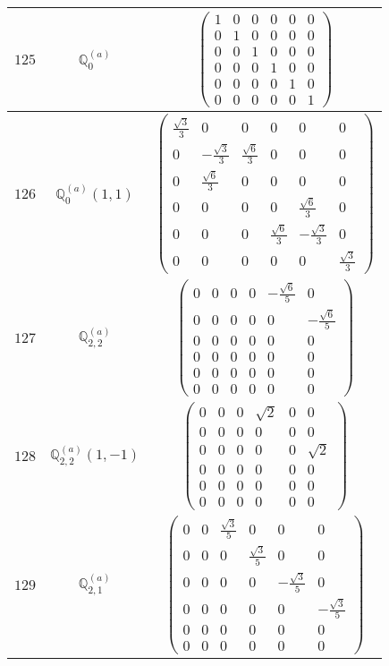 \documentclass[fleqn,8pt,landscape]{jsarticle}
\begin{document}
\begin{center}
\begin{longtable}{ccc}
$ 125 $ & $ \mathbb{Q}_{0}^{(a)} $ & $ \begin{pmatrix} 1 & 0 & 0 & 0 & 0 & 0 \\ 0 & 1 & 0 & 0 & 0 & 0 \\ 0 & 0 & 1 & 0 & 0 & 0 \\ 0 & 0 & 0 & 1 & 0 & 0 \\ 0 & 0 & 0 & 0 & 1 & 0 \\ 0 & 0 & 0 & 0 & 0 & 1 \end{pmatrix} $ \\ \hline
$ 126 $ & $ \mathbb{Q}_{0}^{(a)}(1,1) $ & $ \begin{pmatrix} \frac{\sqrt{3}}{3} & 0 & 0 & 0 & 0 & 0 \\ 0 & - \frac{\sqrt{3}}{3} & \frac{\sqrt{6}}{3} & 0 & 0 & 0 \\ 0 & \frac{\sqrt{6}}{3} & 0 & 0 & 0 & 0 \\ 0 & 0 & 0 & 0 & \frac{\sqrt{6}}{3} & 0 \\ 0 & 0 & 0 & \frac{\sqrt{6}}{3} & - \frac{\sqrt{3}}{3} & 0 \\ 0 & 0 & 0 & 0 & 0 & \frac{\sqrt{3}}{3} \end{pmatrix} $ \\ \hline
$ 127 $ & $ \mathbb{Q}_{2,2}^{(a)} $ & $ \begin{pmatrix} 0 & 0 & 0 & 0 & - \frac{\sqrt{6}}{5} & 0 \\ 0 & 0 & 0 & 0 & 0 & - \frac{\sqrt{6}}{5} \\ 0 & 0 & 0 & 0 & 0 & 0 \\ 0 & 0 & 0 & 0 & 0 & 0 \\ 0 & 0 & 0 & 0 & 0 & 0 \\ 0 & 0 & 0 & 0 & 0 & 0 \end{pmatrix} $ \\ \hline
$ 128 $ & $ \mathbb{Q}_{2,2}^{(a)}(1,-1) $ & $ \begin{pmatrix} 0 & 0 & 0 & \sqrt{2} & 0 & 0 \\ 0 & 0 & 0 & 0 & 0 & 0 \\ 0 & 0 & 0 & 0 & 0 & \sqrt{2} \\ 0 & 0 & 0 & 0 & 0 & 0 \\ 0 & 0 & 0 & 0 & 0 & 0 \\ 0 & 0 & 0 & 0 & 0 & 0 \end{pmatrix} $ \\ \hline
$ 129 $ & $ \mathbb{Q}_{2,1}^{(a)} $ & $ \begin{pmatrix} 0 & 0 & \frac{\sqrt{3}}{5} & 0 & 0 & 0 \\ 0 & 0 & 0 & \frac{\sqrt{3}}{5} & 0 & 0 \\ 0 & 0 & 0 & 0 & - \frac{\sqrt{3}}{5} & 0 \\ 0 & 0 & 0 & 0 & 0 & - \frac{\sqrt{3}}{5} \\ 0 & 0 & 0 & 0 & 0 & 0 \\ 0 & 0 & 0 & 0 & 0 & 0 \end{pmatrix} $ \\ \hline

\end{longtable}
\end{center}
\end{document}
